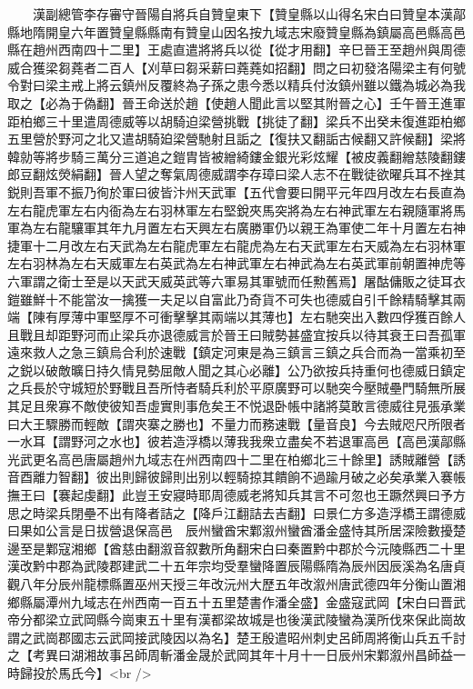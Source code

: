 　　漢副總管李存審守晉陽自將兵自贊皇東下【贊皇縣以山得名宋白曰贊皇本漢鄗縣地隋開皇六年置贊皇縣縣南有贊皇山因名按九域志宋廢贊皇縣為鎮屬高邑縣高邑縣在趙州西南四十二里】王處直遣將將兵以從【從才用翻】辛巳晉王至趙州與周德威合獲梁芻蕘者二百人【刈草曰芻采薪曰蕘蕘如招翻】問之曰初發洛陽梁主有何號令對曰梁主戒上將云鎮州反覆終為子孫之患今悉以精兵付汝鎮州雖以鐵為城必為我取之【必為于偽翻】晉王命送於趙【使趙人聞此言以堅其附晉之心】壬午晉王進軍距柏鄉三十里遣周德威等以胡騎迫梁營挑戰【挑徒了翻】梁兵不出癸未復進距柏鄉五里營於野河之北又遣胡騎廹梁營馳射且詬之【復扶又翻詬古候翻又許候翻】梁將韓勍等將步騎三萬分三道追之鎧胄皆被繒綺鏤金銀光彩炫耀【被皮義翻繒慈陵翻鏤郎豆翻炫熒絹翻】晉人望之奪氣周德威謂李存璋曰梁人志不在戰徒欲曜兵耳不挫其鋭則吾軍不振乃徇於軍曰彼皆汴州天武軍【五代會要曰開平元年四月改左右長直為左右龍虎軍左右内衙為左右羽林軍左右堅銳夾馬突將為左右神武軍左右親隨軍將馬軍為左右龍驤軍其年九月置左右天興左右廣勝軍仍以親王為軍使二年十月置左右神捷軍十二月改左右天武為左右龍虎軍左右龍虎為左右天武軍左右天威為左右羽林軍左右羽林為左右天威軍左右英武為左右神武軍左右神武為左右英武軍前朝置神虎等六軍謂之衛士至是以天武天威英武等六軍易其軍號而任勲舊焉】屠酤傭販之徒耳衣鎧雖鮮十不能當汝一擒獲一夫足以自富此乃奇貨不可失也德威自引千餘精騎擊其兩端【陳有厚薄中軍堅厚不可衝擊擊其兩端以其薄也】左右馳突出入數四俘獲百餘人且戰且却距野河而止梁兵亦退德威言於晉王曰賊勢甚盛宜按兵以待其衰王曰吾孤軍遠來救人之急三鎮烏合利於速戰【鎮定河東是為三鎮言三鎮之兵合而為一當乘初至之鋭以破敵曠日持久情見勢屈敵人聞之其心必離】公乃欲按兵持重何也德威日鎮定之兵長於守城短於野戰且吾所恃者騎兵利於平原廣野可以馳突今壓賊壘門騎無所展其足且衆寡不敵使彼知吾虛實則事危矣王不悦退卧帳中諸將莫敢言德威往見張承業曰大王驟勝而輕敵【謂夾寨之勝也】不量力而務速戰【量音良】今去賊咫尺所限者一水耳【謂野河之水也】彼若造浮橋以薄我我衆立盡矣不若退軍高邑【高邑漢鄗縣光武更名高邑唐屬趙州九域志在州西南四十二里在柏鄉北三十餘里】誘賊離營【誘音酉離力智翻】彼出則歸彼歸則出别以輕騎掠其饋餉不過踰月破之必矣承業入褰帳撫王曰【褰起虔翻】此豈王安寢時耶周德威老將知兵其言不可忽也王蹶然興曰予方思之時梁兵閉壘不出有降者詰之【降戶江翻詰去吉翻】曰景仁方多造浮橋王謂德威曰果如公言是日拔營退保高邑　辰州蠻酋宋鄴溆州蠻酋潘金盛恃其所居深險數擾楚邊至是鄴寇湘鄉【酋慈由翻溆音叙數所角翻宋白曰秦置黔中郡於今沅陵縣西二十里漢改黔中郡為武陵郡建武二十五年宗均受羣蠻降置辰陽縣隋為辰州因辰溪為名唐貞觀八年分辰州龍標縣置巫州天授三年改沅州大歷五年改溆州唐武德四年分衡山置湘鄉縣屬潭州九域志在州西南一百五十五里楚書作潘全盛】金盛寇武岡【宋白曰晋武帝分都梁立武岡縣今崗東五十里有漢都梁故城是也後漢武陵蠻為漢所伐來保此崗故謂之武崗郡國志云武岡接武陵因以為名】楚王殷遣昭州刺史呂師周將衡山兵五千討之【考異曰湖湘故事呂師周斬潘金晟於武岡其年十月十一日辰州宋鄴溆州昌師益一時歸投於馬氏今】<br />
